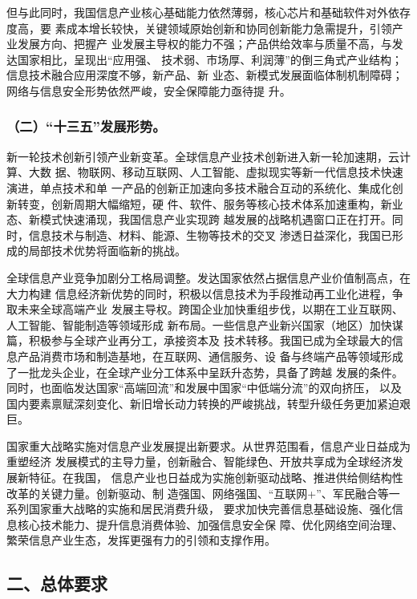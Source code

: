 \documentclass[11pt]{ctexart}
\begin{document}
{{{{但与此同时，我国信息产业核心基础能力依然薄弱，核心芯片和基础软件对外依存度高，要
素成本增长较快，关键领域原始创新和协同创新能力急需提升，引领产业发展方向、把握产
业发展主导权的能力不强；产品供给效率与质量不高，与发达国家相比，呈现出“应用强、
技术弱、市场厚、利润薄”的倒三角式产业结构；信息技术融合应用深度不够，新产品、新
业态、新模式发展面临体制机制障碍；网络与信息安全形势依然严峻，安全保障能力亟待提
升。

\subsubsection{（二）“十三五”发展形势。}
\label{sec:org61885c7}
新一轮技术创新引领产业新变革。全球信息产业技术创新进入新一轮加速期，云计算、大数
据、物联网、移动互联网、人工智能、虚拟现实等新一代信息技术快速演进，单点技术和单
一产品的创新正加速向多技术融合互动的系统化、集成化创新转变，创新周期大幅缩短，硬
件、软件、服务等核心技术体系加速重构，新业态、新模式快速涌现，我国信息产业实现跨
越发展的战略机遇窗口正在打开。同时，信息技术与制造、材料、能源、生物等技术的交叉
渗透日益深化，我国已形成的局部技术优势将面临新的挑战。


全球信息产业竞争加剧分工格局调整。发达国家依然占据信息产业价值制高点，在大力构建
信息经济新优势的同时，积极以信息技术为手段推动再工业化进程，争取未来全球高端产业
发展主导权。跨国企业加快重组步伐，以期在工业互联网、人工智能、智能制造等领域形成
新布局。一些信息产业新兴国家（地区）加快谋篇，积极参与全球产业再分工，承接资本及
技术转移。我国已成为全球最大的信息产品消费市场和制造基地，在互联网、通信服务、设
备与终端产品等领域形成了一批龙头企业，在全球产业分工体系中呈跃升态势，具备了跨越
发展的条件。同时，也面临发达国家“高端回流”和发展中国家“中低端分流”的双向挤压，
以及国内要素禀赋深刻变化、新旧增长动力转换的严峻挑战，转型升级任务更加紧迫艰巨。

国家重大战略实施对信息产业发展提出新要求。从世界范围看，信息产业日益成为重塑经济
发展模式的主导力量，创新融合、智能绿色、开放共享成为全球经济发展新特征。在我国，
信息产业也日益成为实施创新驱动战略、推进供给侧结构性改革的关键力量。创新驱动、制
造强国、网络强国、“互联网+”、军民融合等一系列国家重大战略的实施和居民消费升级，
要求加快完善信息基础设施、强化信息核心技术能力、提升信息消费体验、加强信息安全保
障、优化网络空间治理、繁荣信息产业生态，发挥更强有力的引领和支撑作用。

\subsection{二、总体要求}
\label{sec:org24de86d}
}}}}
\end{document}

